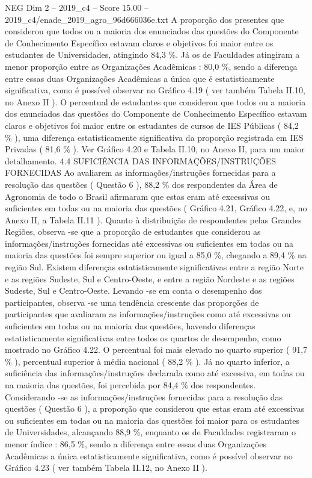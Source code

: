 \begin{textsample}{NEG Dim 2 – 2019\_c4 – Score 15.00 – 2019\_c4/enade\_2019\_agro\_96d666036e.txt}
A proporção dos presentes que considerou que todos ou a maioria dos enunciados das questões do Componente de Conhecimento Específico estavam claros e objetivos foi maior entre os estudantes de Universidades, atingindo 84,3 \%.
Já os de Faculdades atingiram a menor proporção entre as Organizações Acadêmicas : 80,0 \%, sendo a diferença entre essas duas Organizações Acadêmicas a única que é estatisticamente significativa, como é possível observar no Gráfico 4.19 ( ver também Tabela II.10, no Anexo II ).
O percentual de estudantes que considerou que todos ou a maioria dos enunciados das questões do Componente de Conhecimento Específico estavam claros e objetivos foi maior entre os estudantes de cursos de IES Públicas ( 84,2 \% ), uma diferença estatisticamente significativa da proporção registrada em IES Privadas ( 81,6 \% ).
Ver Gráfico 4.20 e Tabela II.10, no Anexo II, para um maior detalhamento. 4.4 SUFICIÊNCIA DAS INFORMAÇÕES/INSTRUÇÕES FORNECIDAS Ao avaliarem as informações/instruções fornecidas para a resolução das questões ( Questão 6 ), 88,2 \% dos respondentes da Área de Agronomia de todo o Brasil afirmaram que estas eram até excessivas ou suficientes em todas ou na maioria das questões ( Gráfico 4.21, Gráfico 4.22, e, no Anexo II, a Tabela II.11 ).
Quanto à distribuição de respondentes pelas Grandes Regiões, observa -se que a proporção de estudantes que considerou as informações/instruções fornecidas até excessivas ou suficientes em todas ou na maioria das questões foi sempre superior ou igual a 85,0 \%, chegando a 89,4 \% na região Sul.
Existem diferenças estatisticamente significativas entre a região Norte e as regiões Sudeste, Sul e Centro-Oeste, e entre a região Nordeste e as regiões Sudeste, Sul e Centro-Oeste.
Levando -se em conta o desempenho dos participantes, observa -se uma tendência crescente das proporções de participantes que avaliaram as informações/instruções como até excessivas ou suficientes em todas ou na maioria das questões, havendo diferenças estatisticamente significativas entre todos os quartos de desempenho, como mostrado no Gráfico 4.22.
O percentual foi mais elevado no quarto superior ( 91,7 \% ), percentual superior à média nacional ( 88,2 \% ).
Já no quarto inferior, a suficiência das informações/instruções declarada como até excessiva, em todas ou na maioria das questões, foi percebida por 84,4 \% dos respondentes.
Considerando -se as informações/instruções fornecidas para a resolução das questões ( Questão 6 ), a proporção que considerou que estas eram até excessivas ou suficientes em todas ou na maioria das questões foi maior para os estudantes de Universidades, alcançando 88,9 \%, enquanto os de Faculdades registraram o menor índice : 86,5 \%, sendo a diferença entre essas duas Organizações Acadêmicas a única estatisticamente significativa, como é possível observar no Gráfico 4.23 ( ver também Tabela II.12, no Anexo II ).

\end{textsample}
